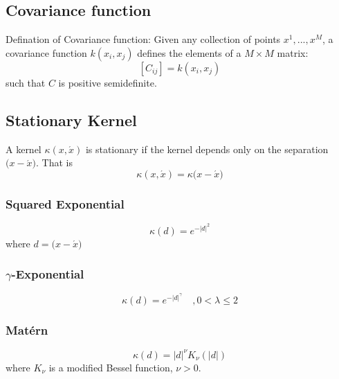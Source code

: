 \documentclass[]{IEEEtran}
\begin{document}
\clearpage
\onecolumn
\begin{appendices}

\section{Covariance function} \label{sec:appendix-1}
 Defination of Covariance function: Given any collection of points \({x}^{1},...,{x}^{M}\), a covariance function  \(k({x}_{i},{x}_{j})\) deﬁnes the elements of a \(M\times M\) matrix: 
\begin{equation}
\left[ { C }_{ ij } \right] =k({ x }_{ i },{ x }_{ j })
\label{kernel00}
\end{equation}
such that \(C\) is positive semideﬁnite.\par
\subsection{Stationary Kernel}
 A kernel  \({\kappa  }({ x },\acute { x } )\) is stationary if the kernel depends only on the separation \({ { ({ x }-\acute { x }  }) }\). That is 
\begin{equation}
{ \kappa  }({ x },\acute { x } )={ \kappa  }{ { ({ x }-\acute { x }  }) }
\label{kernel01}
\end{equation}\par
\subsubsection{Squared Exponential}
\begin{equation}
{ \kappa  }(d)={ e }^{ -{ \left| d \right|  }^{ 2 } }
\label{kernel02}
\end{equation}
where \({d} = { ({ x }-\acute { x }  })\)\par
\subsubsection{\(\gamma\)-Exponential}
\begin{equation}
{ \kappa  }(d)={ e }^{ -{ \left| d \right|  }^{ \gamma  } }\quad ,0<\lambda \le 2
\label{kernel03}
\end{equation}\par
\subsubsection{Mat\'ern}
\begin{equation}
{ \kappa  }(d)={ \left| d \right|  }^{ { \nu  } }{ K }_{ \nu  }\left( \left| d \right|  \right) 
\label{kernel04}
\end{equation}
where \({ K }_{ \nu  }\) is a modified Bessel function, \(\nu >0\).\par

\end{appendices}
\end{document}
